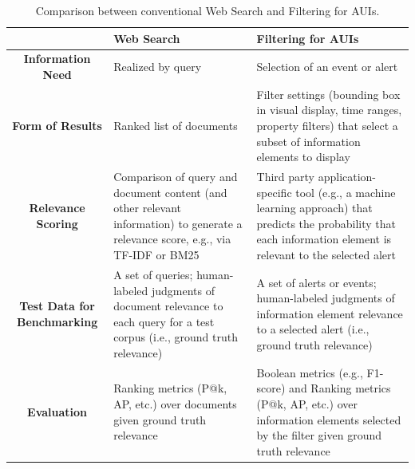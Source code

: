 \begin{table}[t]
\caption{Comparison between conventional Web Search and Filtering for AUIs.}
\label{tbl:Comparaison2IR}
\centering{}%
\begin{tabular}{|c|>{\centering}p{6cm}|>{\centering}p{6cm}|}
\hline 
 & \textbf{Web Search} & \textbf{Filtering for AUIs}\tabularnewline
\hline 
\hline 
\textbf{Information Need} & Realized by query  & Selection of an event or alert\tabularnewline
\hline 
\textbf{Form of Results} & Ranked list of documents & Filter settings (bounding box in visual display, time ranges, property
filters) that select a subset of information elements to display\tabularnewline
\hline 
\textbf{Relevance Scoring} & Comparison of query and document content (and other relevant information)
to generate a relevance score, e.g., via TF-IDF or BM25 & Third party application-specific tool (e.g., a machine learning approach)
that predicts the probability that each information element is relevant
to the selected alert\tabularnewline
\hline 
\textbf{Test Data for Benchmarking} & A set of queries; human-labeled judgments of document relevance to
each query for a test corpus (i.e., ground truth relevance) & A set of alerts or events; human-labeled judgments of information element relevance
to a selected alert (i.e., ground truth relevance)\tabularnewline
\hline 
\textbf{Evaluation} & Ranking metrics (P@k, AP, etc.) over documents given ground truth
relevance  & Boolean metrics (e.g., F1-score) and Ranking metrics (P@k, AP, etc.)
over information elements selected by the filter given ground truth
relevance \tabularnewline
\hline 
\end{tabular}
\end{table}


